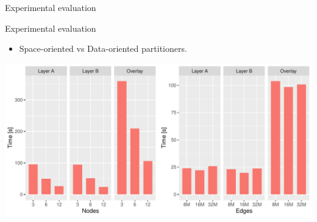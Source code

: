 \begin{frame}{Experimental evaluation}
    \end{frame}
    
    \begin{frame}{Experimental evaluation}
        \begin{itemize}
            \item Space-oriented vs Data-oriented partitioners.
        \end{itemize}
        \vspace{5mm}
        \includegraphics[width=\textwidth]{../thesis/chapterExtension/K_SS/K_SS}
    \end{frame}

